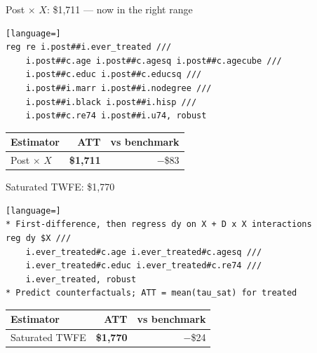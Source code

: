 \documentclass[aspectratio=169,11pt]{beamer}
\begin{document}
\begin{frame}[fragile]{Post$\,\times\,X$: \$1,711 --- now in the right range}
\vspace{0.4em}
\begin{lstlisting}[language=]
reg re i.post##i.ever_treated ///
    i.post##c.age i.post##c.agesq i.post##c.agecube ///
    i.post##c.educ i.post##c.educsq ///
    i.post##i.marr i.post##i.nodegree ///
    i.post##i.black i.post##i.hisp ///
    i.post##c.re74 i.post##i.u74, robust
\end{lstlisting}
\vspace{0.4em}
\begin{center}
\begin{tabular}{lrr}
\toprule
Estimator & ATT & vs benchmark \\
\midrule
Post$\,\times\,X$ & \textbf{\$1,711} & $-$\$83 \\
\bottomrule
\end{tabular}
\end{center}
\end{frame}

\begin{frame}[fragile]{Saturated TWFE: \$1,770}
\vspace{0.3em}
\begin{lstlisting}[language=]
* First-difference, then regress dy on X + D x X interactions
reg dy $X ///
    i.ever_treated#c.age i.ever_treated#c.agesq ///
    i.ever_treated#c.educ i.ever_treated#c.re74 ///
    i.ever_treated, robust
* Predict counterfactuals; ATT = mean(tau_sat) for treated
\end{lstlisting}
\vspace{0.3em}
\begin{center}
\begin{tabular}{lrr}
\toprule
Estimator & ATT & vs benchmark \\
\midrule
Saturated TWFE & \textbf{\$1,770} & $-$\$24 \\
\bottomrule
\end{tabular}
\end{center}
\end{frame}
\end{document}
